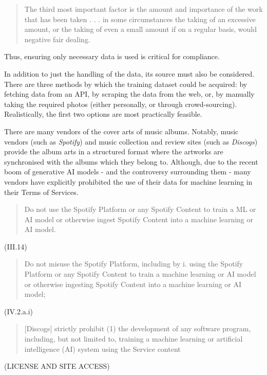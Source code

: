                   \begin{quote}
                      The third most important factor is the amount and importance of the work that has been taken . . . in some circumstances the taking of an excessive amount, or the taking of even a small amount if on a regular basis, would negative fair dealing. \cite{tmlocad}
                  \end{quote}
    
                  Thus, ensuring only necessary data is used is critical for compliance.
    
                  In addition to just the handling of the data, its source must also be considered. There are three methods by which the training dataset could be acquired: by fetching data from an API, by scraping the data from the web, or, by manually taking the required photos (either personally, or through crowd-sourcing). Realistically, the first two options are most practically feasible.
    
                  There are many vendors of the cover arts of music albums. Notably, music vendors (such as \textit{Spotify}) and music collection and review sites (such as \textit{Discogs}) provide the album arts in a structured format where the artworks are synchronised with the albums which they belong to. Although, due to the recent boom of generative AI models - and the controversy surrounding them \cite{apnews2025mccartney_ai_warning} - many vendors have explicitly prohibited the use of their data for machine learning in their Terms of Services.
    
                  \begin{quote}
                      Do not use the Spotify Platform or any Spotify Content to train a ML or AI model or otherwise ingest Spotify Content into a machine learning or AI model.
                  \end{quote} \cite{spotifyDevPolicy} (III.14)
                  \begin{quote}
                      Do not misuse the Spotify Platform, including by i. using the Spotify Platform or any Spotify Content to train a machine learning or AI model or otherwise ingesting Spotify Content into a machine learning or AI model;
                  \end{quote} \cite{spotifyDevTerms} (IV.2.a.i)
                  \begin{quote}
                      [Discogs] strictly prohibit (1) the development of any software program, including, but not limited to, training a machine learning or artificial intelligence (AI) system using the Service content
                  \end{quote} \cite{discogsToS} (LICENSE AND SITE ACCESS)
    
